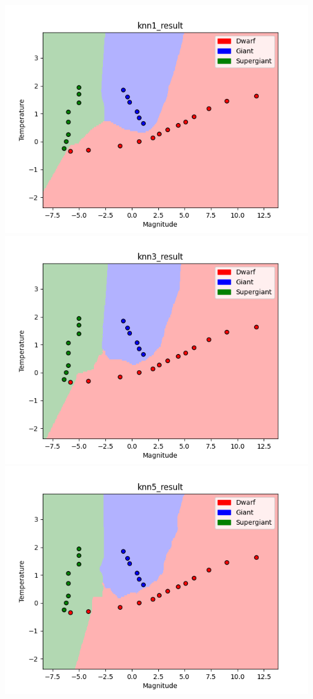 \documentclass[submit]{harvardml}
\begin{document}
\begin{center}
    \includegraphics[scale=0.7]{knn1_result.png}\\
    \includegraphics[scale=0.7]{knn3_result.png}\\
    \includegraphics[scale=0.7]{knn5_result.png}
\end{center}
\end{document}
